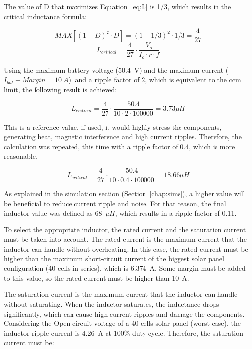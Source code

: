 The value of D that maximizes Equation~\ref{eq:L} is 1/3, which results in the critical inductance formula:

\begin{equation}
    MAX[(1-D)^2\cdot D]= (1-1/3)^2 \cdot 1/3= \frac{4}{27}
\end{equation}
\begin{equation}
    L_{critical} = \frac{4}{27} \cdot \frac{V_o}{I_o \cdot r \cdot f}
\end{equation}

Using the maximum battery voltage (50.4~V) and the maximum current ($I_{bat}+Margin=10~A$), and a ripple factor of 2, which is equivalent  to the \ac{ccm} limit, the following result is achieved:

\begin{equation}
    L_{critical} = \frac{4}{27} \cdot \frac{50.4}{10 \cdot 2 \cdot 100000} = 3.73 \mu H
\end{equation}

This is a reference value, if used, it would highly stress the components, generating heat, magnetic interference and high current ripples. Therefore, the calculation was repeated, this time with a ripple factor of 0.4, which is more reasonable. 

\begin{equation}
    L_{critical} = \frac{4}{27} \cdot \frac{50.4}{10 \cdot 0.4 \cdot 100000} = 18.66 \mu H
\end{equation}

As explained in the simulation section (Section~\ref{chap:sims}), a higher value will be beneficial to reduce current ripple and noise. For that reason, the final inductor value was defined as 68~$\mu H$, which results in a ripple factor of 0.11.

To select the appropriate inductor, the rated current and the saturation current must be taken into account. The rated current is the maximum current that the inductor can handle without overheating. In this case, the rated current must be higher than the maximum short-circuit current of the biggest solar panel configuration (40 cells in series), which is 6.374~A. Some margin must be added to this value, so the rated current must be higher than 10~A.

The saturation current is the maximum current that the inductor can handle without saturating. When the inductor saturates, the inductance drops significantly, which can cause high current ripples and damage the components. Considering the Open circuit voltage of a 40 cells solar panel (worst case), the inductor ripple current is 4.26~A at 100\% duty cycle. Therefore, the saturation current must be:

